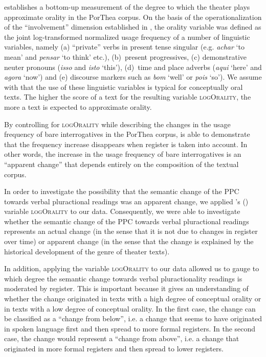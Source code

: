\documentclass[output=paper,colorlinks,citecolor=brown]{langscibook}
\begin{document}
\citet[175]{Rosemeyer2019a} establishes a bottom-up measurement of the degree to which the theater plays approximate orality in the PorThea corpus. On the basis of the operationalization of the “involvement” dimension established in \citet{BiberFinegan2004}, the orality variable was defined as the joint log-transformed normalized usage frequency of a number of linguistic variables, namely (a) “private” verbs in present tense singular (e.g. \textit{achar} ‘to mean’ and \textit{pensar} ‘to think’ etc.), (b)~present progressives, (c) demonstrative neuter pronouns (\textit{isso} and \textit{isto} ‘this’), (d)~time and place adverbs (\textit{aqui} ‘here’ and \textit{agora} ‘now’) and (e) discourse markers such as \textit{bom} ‘well’ or \textit{pois} ‘so’). We assume with \citeauthor{BiberFinegan2004} that the use of these linguistic variables is typical for conceptually oral texts. The higher the score of a text for the resulting variable \textsc{logOrality}, the more a text is expected to approximate orality.

By controlling for \textsc{logOrality} while describing the changes in the usage frequency of bare interrogatives in the PorThea corpus, \citet{Rosemeyer2019a} is able to demonstrate that the frequency increase disappears when register is taken into account. In other words, the increase in the usage frequency of bare interrogatives is an “apparent change” that depends entirely on the composition of the textual corpus.

In order to investigate the possibility that the semantic change of the PPC towards verbal pluractional readings was an apparent change, we applied \citeauthor{Rosemeyer2019a}’s (\citeyear{Rosemeyer2019a}) variable \textsc{logOrality} to our data. Consequently, we were able to investigate whether the semantic change of the PPC towards verbal pluractional readings represents an actual change (in the sense that it is not due to changes in register over time) or apparent change (in the sense that the change is explained by the historical development of the genre of theater texts).

In addition, applying the variable \textsc{logOrality} to our data allowed us to gauge to which degree the semantic change towards verbal pluractionality readings is moderated by register. This is important because it gives an understanding of whether the change originated in texts with a high degree of conceptual orality or in texts with a low degree of conceptual orality. In the first case, the change can be classified as a “change from below”, i.e. a change that seems to have originated in spoken language first and then spread to more formal registers. In the second case, the change would represent a “change from above”, i.e. a change that originated in more formal registers and then spread to lower registers.
\end{document}
